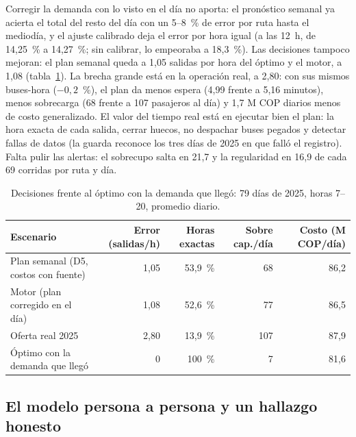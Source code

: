 Corregir la demanda con lo visto en el día no aporta: el pronóstico semanal ya acierta el total del resto del día con
un 5--8~\% de error por ruta hasta el mediodía, y el ajuste calibrado deja el error por hora igual (a las 12~h, de
14,25~\% a 14,27~\%; sin calibrar, lo empeoraba a 18,3~\%). Las decisiones tampoco mejoran: el plan semanal queda a 1,05
salidas por hora del óptimo y el motor, a 1,08 (tabla~\ref{tab:oraculo}). La brecha grande está en la operación real, a
2,80: con sus mismos buses-hora ($-0{,}2$~\%), el plan da menos espera (4,99 frente a 5,16 minutos), menos sobrecarga
(68 frente a 107 pasajeros al día) y 1,7 M COP diarios menos de costo generalizado. El valor del tiempo real está en
ejecutar bien el plan: la hora exacta de cada salida, cerrar huecos, no despachar buses pegados y detectar fallas de
datos (la guarda reconoce los tres días de 2025 en que falló el registro). Falta pulir las alertas: el sobrecupo salta
en 21,7 y la regularidad en 16,9 de cada 69 corridas por ruta y día.

\begin{table}[t]
  \centering\footnotesize
  \setlength{\tabcolsep}{3.5pt}
  \caption{Decisiones frente al óptimo con la demanda que llegó: 79 días de 2025, horas 7--20, promedio diario.}
  \label{tab:oraculo}
  \begin{tabular}{@{}l r r r r@{}}
    \toprule
    Escenario & Error (salidas/h) & Horas exactas & Sobre cap./día & Costo (M COP/día) \\
    \midrule
    Plan semanal (D5, costos con fuente) & 1,05 & 53,9~\% & 68 & 86,2 \\
    Motor (plan corregido en el día) & 1,08 & 52,6~\% & 77 & 86,5 \\
    Oferta real 2025 & 2,80 & 13,9~\% & 107 & 87,9 \\
    Óptimo con la demanda que llegó & 0 & 100~\% & 7 & 81,6 \\
    \bottomrule
  \end{tabular}
\end{table}

\subsection{El modelo persona a persona y un hallazgo honesto}
\label{sec:res-persona}

